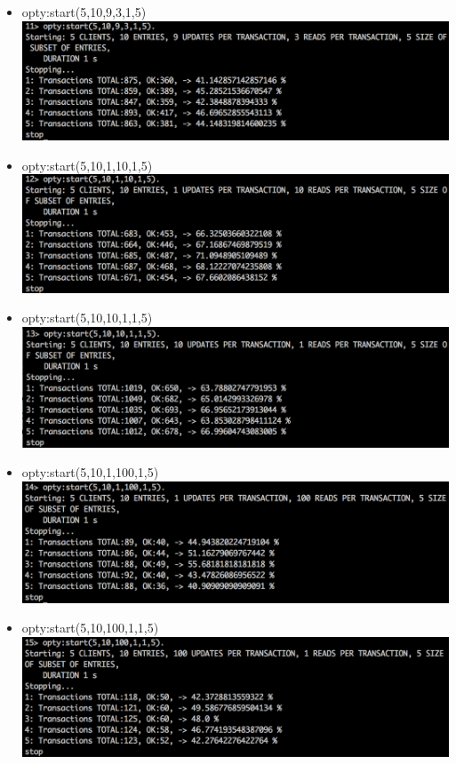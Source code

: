 \documentclass[a4paper, 11pt]{article}
\begin{document}
\begin{itemize}
\item opty:start(5,10,9,3,1,5)\\
\includegraphics[scale=0.5]{images/exp-iv-4.png} \\
\newpage
\item opty:start(5,10,1,10,1,5)\\
\includegraphics[scale=0.5]{images/exp-iv-5.png} \\
\item opty:start(5,10,10,1,1,5)\\
\includegraphics[scale=0.5]{images/exp-iv-6.png} \\
\item opty:start(5,10,1,100,1,5)\\
\includegraphics[scale=0.5]{images/exp-iv-7.png} \\
\item opty:start(5,10,100,1,1,5)\\
\includegraphics[scale=0.5]{images/exp-iv-8.png} \\
\end{itemize}
\end{document}
